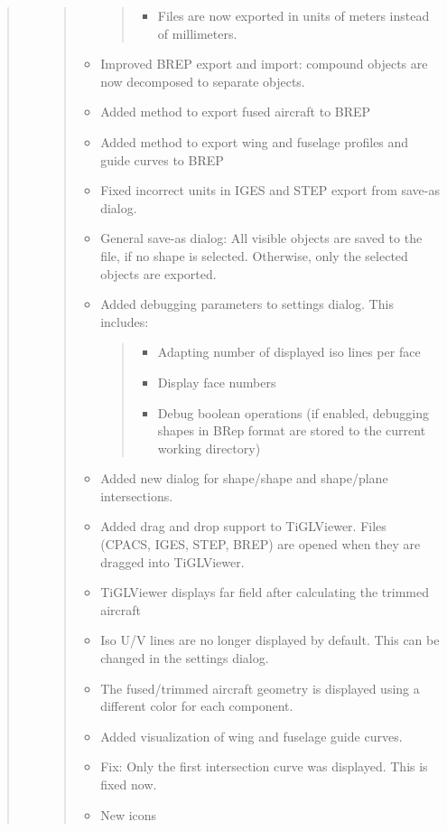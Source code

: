 \documentclass[]{scrartcl}
\begin{document}
\begin{quote}
\begin{itemize}
\begin{quote}
\begin{itemize}
    \begin{quote}
    \begin{itemize}
    \itemsep1pt\parskip0pt
    \item
      Files are now exported in units of meters instead of millimeters.
    \end{itemize}
    \end{quote}
  \item
    Improved BREP export and import: compound objects are now decomposed
    to separate objects.
  \item
    Added method to export fused aircraft to BREP
  \item
    Added method to export wing and fuselage profiles and guide curves
    to BREP
  \item
    Fixed incorrect units in IGES and STEP export from save-as dialog.
  \item
    General save-as dialog: All visible objects are saved to the file,
    if no shape is selected. Otherwise, only the selected objects are
    exported.
  \item
    Added debugging parameters to settings dialog. This includes:

    \begin{quote}
    \begin{itemize}
    \itemsep1pt\parskip0pt
    \item
      Adapting number of displayed iso lines per face
    \item
      Display face numbers
    \item
      Debug boolean operations (if enabled, debugging shapes in BRep
      format are stored to the current working directory)
    \end{itemize}
    \end{quote}
  \item
    Added new dialog for shape/shape and shape/plane intersections.
  \item
    Added drag and drop support to TiGLViewer. Files (CPACS, IGES, STEP,
    BREP) are opened when they are dragged into TiGLViewer.
  \item
    TiGLViewer displays far field after calculating the trimmed aircraft
  \item
    Iso U/V lines are no longer displayed by default. This can be
    changed in the settings dialog.
  \item
    The fused/trimmed aircraft geometry is displayed using a different
    color for each component.
  \item
    Added visualization of wing and fuselage guide curves.
  \item
    Fix: Only the first intersection curve was displayed. This is fixed
    now.
  \item
    New icons
  \end{itemize}
  \end{quote}
\end{itemize}
\end{quote}
\end{document}
